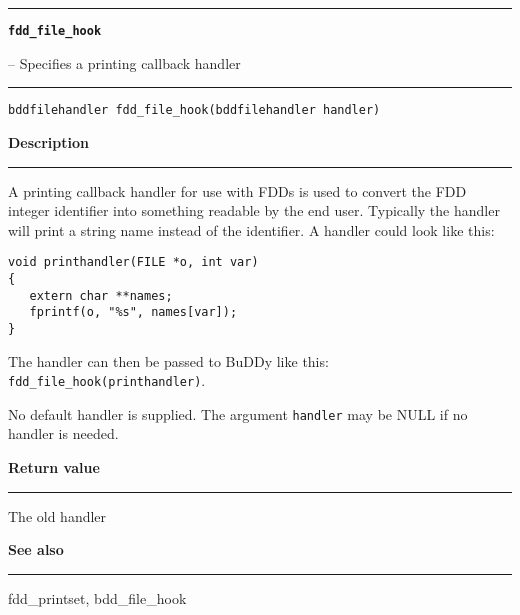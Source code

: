 \vspace{8ex}
\begin{minipage}{\textwidth}

\noindent\begin{minipage}{\textwidth}
\rule{\textwidth}{0.5mm}
{\tt\bf fdd\_file\_hook }
\--- Specifies a printing callback handler  \hspace{\fill}
\\\rule[1.5ex]{\textwidth}{0.5mm}
\end{minipage}

\noindent\begin{verbatim}
bddfilehandler fdd_file_hook(bddfilehandler handler) 
\end{verbatim}

\vspace{\parsep}\noindent
{\bf Description}\\\rule[1.5ex]{\textwidth}{0.2mm}\vspace{-1.5ex}\setlength{\parindent}{1em}
A printing callback handler for use with FDDs is used to
           convert the FDD integer identifier into something readable by the
	   end user. Typically the handler will print a string name
	   instead of the identifier. A handler could look like this:
	   \begin{verbatim}
void printhandler(FILE *o, int var)
{
   extern char **names;
   fprintf(o, "%s", names[var]);
}
\end{verbatim}

           \noindent
           The handler can then be passed to BuDDy like this:
	   {\tt fdd\_file\_hook(printhandler)}.

	   No default handler is supplied. The argument {\tt handler} may be
	   NULL if no handler is needed. 

\setlength{\parindent}{0em}\vspace{\parsep}\vspace{\baselineskip}\noindent
{\bf Return value}\\\rule[1.5ex]{\textwidth}{0.2mm}\vspace{-1.5ex}
The old handler 

\vspace{\parsep}\vspace{\baselineskip}\noindent
{\bf See also}\\\rule[1.5ex]{\textwidth}{0.2mm}\vspace{-1.5ex}
fdd\_printset, bdd\_file\_hook 
\end{minipage}

